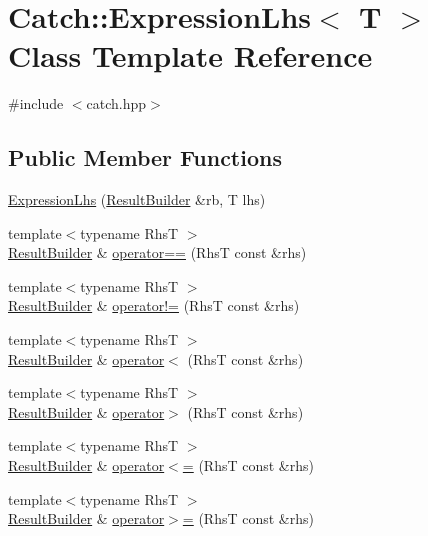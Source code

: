 \hypertarget{class_catch_1_1_expression_lhs}{}\section{Catch\+:\+:Expression\+Lhs$<$ T $>$ Class Template Reference}
\label{class_catch_1_1_expression_lhs}


{\ttfamily \#include $<$catch.\+hpp$>$}

\subsection*{Public Member Functions}
\begin{DoxyCompactItemize}
\item 
\hyperlink{class_catch_1_1_expression_lhs_aa829588def6146a94fb75de9c4cc482a}{Expression\+Lhs} (\hyperlink{class_catch_1_1_result_builder}{Result\+Builder} \&rb, T lhs)
\item 
{\footnotesize template$<$typename RhsT $>$ }\\\hyperlink{class_catch_1_1_result_builder}{Result\+Builder} \& \hyperlink{class_catch_1_1_expression_lhs_a2f7ad442c3e5e5764eee736345c40301}{operator==} (RhsT const \&rhs)
\item 
{\footnotesize template$<$typename RhsT $>$ }\\\hyperlink{class_catch_1_1_result_builder}{Result\+Builder} \& \hyperlink{class_catch_1_1_expression_lhs_a44df9974cf20fcfda4e5b6b3c01d5f93}{operator!=} (RhsT const \&rhs)
\item 
{\footnotesize template$<$typename RhsT $>$ }\\\hyperlink{class_catch_1_1_result_builder}{Result\+Builder} \& \hyperlink{class_catch_1_1_expression_lhs_a48428d358ddc89729e2e3407f4024dac}{operator$<$} (RhsT const \&rhs)
\item 
{\footnotesize template$<$typename RhsT $>$ }\\\hyperlink{class_catch_1_1_result_builder}{Result\+Builder} \& \hyperlink{class_catch_1_1_expression_lhs_ad3602a7ad945c751004065b1007dc183}{operator$>$} (RhsT const \&rhs)
\item 
{\footnotesize template$<$typename RhsT $>$ }\\\hyperlink{class_catch_1_1_result_builder}{Result\+Builder} \& \hyperlink{class_catch_1_1_expression_lhs_afd188990e8a14b49c308ce7a79056846}{operator$<$=} (RhsT const \&rhs)
\item 
{\footnotesize template$<$typename RhsT $>$ }\\\hyperlink{class_catch_1_1_result_builder}{Result\+Builder} \& \hyperlink{class_catch_1_1_expression_lhs_a21d30d6026ff2b1f86ddbd6b0a90d036}{operator$>$=} (RhsT const \&rhs)

\end{DoxyCompactItemize}
